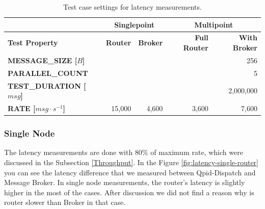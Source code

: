 \begingroup
\setlength{\tabcolsep}{10pt} %
\renewcommand{\arraystretch}{1.35} %
	\begin{table}[H]
	\centering
	\begin{tabular}{|l|r|r|r|r|}
	\hline
	\rowcolor[HTML]{C5E3DF}
	 & \multicolumn{2}{c|}{\textbf{Singlepoint}} & \multicolumn{2}{c|}{\textbf{Multipoint}} \\ \hline
	\rowcolor[HTML]{C5E3DF}
	\textbf{Test Property} & \textbf{Router} & \textbf{Broker} & \textbf{Full Router} & \textbf{With Broker} \\ \hline
	\textbf{MESSAGE\_SIZE [$B$]} & \multicolumn{4}{r|}{256} \\ \hline
	\textbf{PARALLEL\_COUNT} & \multicolumn{4}{r|}{5} \\ \hline
	\textbf{TEST\_DURATION [$msg$]} & \multicolumn{4}{r|}{2,000,000} \\ \hline
	\textbf{RATE [$msg \cdot s^{-1}$]} & 15,000 & 4,600 & 3,600 & 7,600 \\ \hline
	\end{tabular}
	\caption{Test case settings for latency measurements.}
	\label{tab:test_case_latency}
	\end{table}
\endgroup

\subsubsection*{Single Node}
The latency measurements are done with 80\% of maximum rate, which were discussed in the Subsection \ref{Throughput}. In the Figure \ref{fig:latency-single-router} you can see the latency difference that we measured between Qpid-Dispatch and Message Broker. In single node measurements, the router's latency is slightly higher in the most of the cases. After discussion we did not find a reason why is router slower than Broker in that case.


